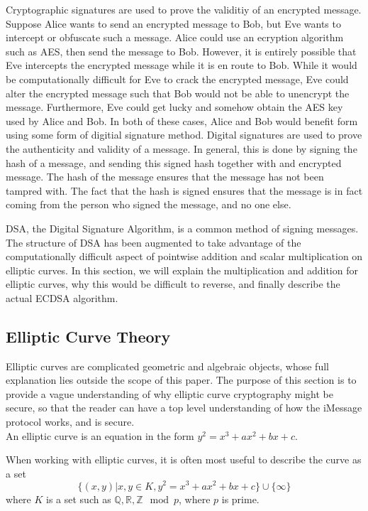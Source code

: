 Cryptographic signatures are used to prove the validitiy of an encrypted message.
Suppose Alice wants to send an encrypted message to Bob, but Eve wants to intercept
or obfuscate such a message.  Alice could use an ecryption algorithm such as AES,
then send the message to Bob.  However, it is entirely possible that Eve intercepts
the encrypted message while it is en route to Bob.  While it would be computationally
difficult for Eve to crack the encrypted message, Eve could alter the encrypted message
such that Bob would not be able to unencrypt the message. Furthermore, Eve could get lucky
and somehow obtain the AES key used by Alice and Bob. In both of these cases, Alice and Bob
would benefit form using some form of digitial signature method.  Digital signatures
are used to prove the authenticity and validity of a message.  In general, this is done by
signing the hash of a message, and sending this signed hash together with and encrypted message.
The hash of the message ensures that the message has not been
tampred with.  The fact that the hash is signed ensures that the message is in fact coming
from the person who signed the message, and no one else.

DSA, the Digital Signature Algorithm, is a common method of signing messages.
The structure of DSA has been augmented to take advantage of the
computationally difficult aspect of pointwise addition and scalar multiplication
on elliptic curves.  In this section, we will explain the multiplication
and addition for elliptic curves, why this would be difficult to reverse,
and finally describe the actual ECDSA algorithm.

\subsection{Elliptic Curve Theory}

Elliptic curves are complicated geometric and algebraic objects,
whose full explanation lies outside the scope of this paper.
The purpose of this section is to provide a vague understanding
of why elliptic curve cryptography might be secure, so that the reader
can have a top level understanding of how the iMessage protocol
works, and is secure.\\

An elliptic curve is an equation in the form $y^2 = x^3 + ax^2 + bx + c$.

When working with elliptic curves, it is often most useful to describe the curve as a set
$$\{(x,y) \vert x,y \in K, y^2 = x^3 + ax^2 + bx + c\} \cup \{ \infty \}$$ where $K$ is a set such as
$\mathbb{Q}, \mathbb{R}, \mathbb{Z} \mod p$, where $p$ is prime.

